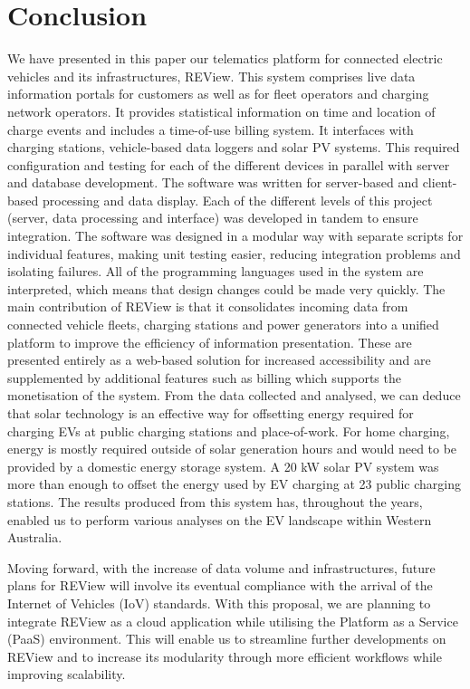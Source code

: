 \section{Conclusion}
\label{sec:9:conclusion}
We have presented in this paper our telematics platform for connected electric vehicles and its infrastructures, REView. This system comprises live data information portals for customers as well as for fleet operators and charging network operators. It provides statistical information on time and location of charge events and includes a time-of-use billing system. It interfaces with charging stations, vehicle-based data loggers and solar PV systems. This required configuration and testing for each of the different devices in parallel with server and database development. The software was written for server-based and client-based processing and data display. Each of the different levels of this project (server, data processing and interface) was developed in tandem to ensure integration. The software was designed in a modular way with separate scripts for individual features, making unit testing easier, reducing integration problems and isolating failures. All of the programming languages used in the system are interpreted, which means that design changes could be made very quickly. The main contribution of REView is that it consolidates incoming data from connected vehicle fleets, charging stations and power generators into a unified platform to improve the efficiency of information presentation. These are presented entirely as a web-based solution for increased accessibility and are supplemented by additional features such as billing which supports the monetisation of the system. From the data collected and analysed, we can deduce that solar technology is an effective way for offsetting energy required for charging EVs at public charging stations and place-of-work. For home charging, energy is mostly required outside of solar generation hours and would need to be provided by a domestic energy storage system. A 20 kW solar PV system was more than enough to offset the energy used by EV charging at 23 public charging stations. The results produced from this system has, throughout the years, enabled us to perform various analyses on the EV landscape within Western Australia. 

Moving forward, with the increase of data volume and infrastructures, future plans for REView will involve its eventual compliance with the arrival of the Internet of Vehicles (IoV) standards. With this proposal, we are planning to integrate REView as a cloud application while utilising the Platform as a Service (PaaS) environment. This will enable us to streamline further developments on REView and to increase its modularity through more efficient workflows while improving scalability.

